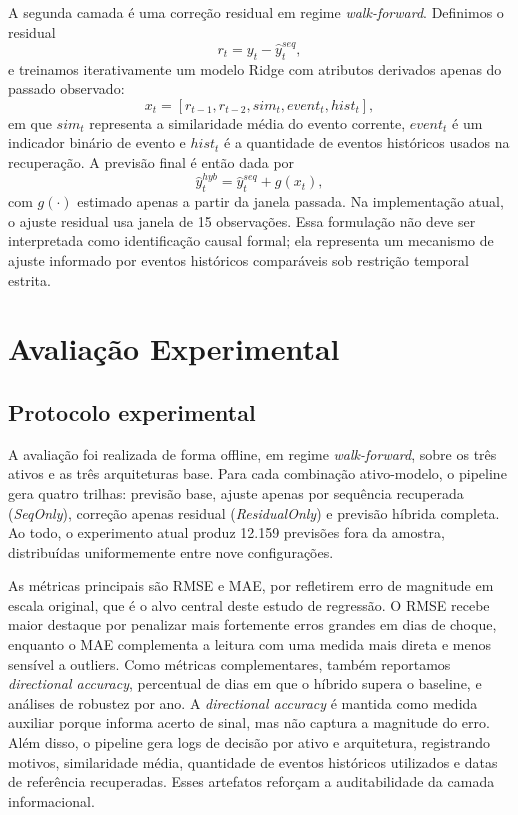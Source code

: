 \documentclass[12pt]{article}
\begin{document}
A segunda camada é uma correção residual em regime \textit{walk-forward}. Definimos o residual
\[
r_t = y_t - \hat{y}^{seq}_{t},
\]
e treinamos iterativamente um modelo Ridge com atributos derivados apenas do passado observado:
\[
x_t = [r_{t-1}, r_{t-2}, sim_t, event_t, hist_t],
\]
em que $sim_t$ representa a similaridade média do evento corrente, $event_t$ é um indicador binário de evento e $hist_t$ é a quantidade de eventos históricos usados na recuperação. A previsão final é então dada por
\[
\hat{y}^{hyb}_{t} = \hat{y}^{seq}_{t} + g(x_t),
\]
com $g(\cdot)$ estimado apenas a partir da janela passada. Na implementação atual, o ajuste residual usa janela de 15 observações. Essa formulação não deve ser interpretada como identificação causal formal; ela representa um mecanismo de ajuste informado por eventos históricos comparáveis sob restrição temporal estrita.

\section{Avaliação Experimental}

\subsection{Protocolo experimental}

A avaliação foi realizada de forma offline, em regime \textit{walk-forward}, sobre os três ativos e as três arquiteturas base. Para cada combinação ativo-modelo, o pipeline gera quatro trilhas: previsão base, ajuste apenas por sequência recuperada (\textit{SeqOnly}), correção apenas residual (\textit{ResidualOnly}) e previsão híbrida completa. Ao todo, o experimento atual produz 12.159 previsões fora da amostra, distribuídas uniformemente entre nove configurações.

As métricas principais são RMSE e MAE, por refletirem erro de magnitude em escala original, que é o alvo central deste estudo de regressão. O RMSE recebe maior destaque por penalizar mais fortemente erros grandes em dias de choque, enquanto o MAE complementa a leitura com uma medida mais direta e menos sensível a outliers. Como métricas complementares, também reportamos \textit{directional accuracy}, percentual de dias em que o híbrido supera o baseline, e análises de robustez por ano. A \textit{directional accuracy} é mantida como medida auxiliar porque informa acerto de sinal, mas não captura a magnitude do erro. Além disso, o pipeline gera logs de decisão por ativo e arquitetura, registrando motivos, similaridade média, quantidade de eventos históricos utilizados e datas de referência recuperadas. Esses artefatos reforçam a auditabilidade da camada informacional.
\end{document}
